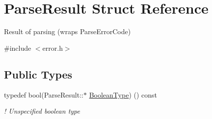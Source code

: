 \hypertarget{structParseResult}{}\section{Parse\+Result Struct Reference}
\label{structParseResult}


Result of parsing (wraps Parse\+Error\+Code)  




{\ttfamily \#include $<$error.\+h$>$}

\subsection*{Public Types}
\begin{DoxyCompactItemize}
\item 
typedef bool(Parse\+Result\+::$\ast$ \hyperlink{structParseResult_a5fed32e2f2cbecd30550ae47c9a616c2}{Boolean\+Type}) () const \hypertarget{structParseResult_a5fed32e2f2cbecd30550ae47c9a616c2}{}\label{structParseResult_a5fed32e2f2cbecd30550ae47c9a616c2}

\begin{DoxyCompactList}\small\item\em ! Unspecified boolean type \end{DoxyCompactList}\end{DoxyCompactItemize}
